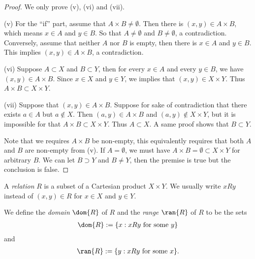 \begin{proof}
    We only prove (v), (vi) and (vii).

    (v) For the ``if'' part, assume that $A \times B \neq \emptyset$. Then there is $(x, y) \in A \times B$, which means $x \in A$ and $y \in B$. So that $A \neq \emptyset$ and $B \neq \emptyset$, a contradiction. Conversely, assume that neither $A$ nor $B$ is empty, then there is $x \in A$ and $y \in B$. This implies $(x, y) \in A \times B$, a contradiction.

    (vi) Suppose $A \subset X$ and $B \subset Y$, then for every $x \in A$ and every $y \in B$, we have $(x, y) \in A \times B$. Since $x \in X$ and $y \in Y$, we implies that $(x, y) \in X \times Y$. Thus $A \times B \subset X \times Y$.

    (vii) Suppose that $(x, y) \in A \times B$. Suppose for sake of contradiction that there exists $a \in A$ but $a \notin X$. Then $(a, y) \in A \times B$ and $(a, y) \notin X \times Y$, but it is impossible for that $A \times B \subset X \times Y$. Thus $A \subset X$. A same proof shows that $B \subset Y$.

    Note that we requires $A \times B$ be non-empty, this equivalently requires that both $A$ and $B$ are non-empty from (v). If $A = \emptyset$, we must have $A \times B = \emptyset \subset X \times Y$ for arbitrary $B$. We can let $B \supset Y$ and $B \neq Y$, then the premise is true but the conclusion is false.
\end{proof}

\begin{definition}[Relations]
    A \emph{relation} $R$ is a subset of a Cartesian product $X \times Y$. We usually write $x R y$ instead of $(x, y) \in R$ for $x \in X$ and $y \in Y$.

    We define the \emph{domain} $\dom{R}$ of $R$ and the \emph{range} $\ran{R}$ of $R$ to be the sets
    \begin{align*}
        \dom{R} := \{x : x R y \text{ for some } y\}
    \end{align*}
    and
    \begin{align*}
        \ran{R} := \{y : x R y \text{ for some } x\}.
    \end{align*}
\end{definition}


